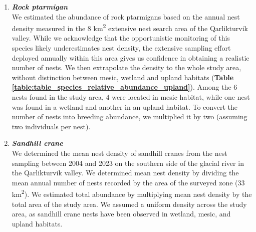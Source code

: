 \documentclass[a4paper,twoside,12pt]{article}
\begin{document}
\begin{enumerate}[label=\alph*.]
                \item[] \textit{\textbf{Rock ptarmigan}}\\
                We estimated the abundance of rock ptarmigans based on the annual nest density measured in the 8 km\textsuperscript{2} extensive nest search area of the Qarlikturvik valley. While we acknowledge that the opportunistic monitoring of this species likely underestimates nest density, the extensive sampling effort deployed annually within this area gives us confidence in obtaining a realistic number of nests. We then extrapolate the density to the whole study area, without distinction between mesic, wetland and upland habitats (\textbf{Table \ref{table:table_species_relative_abundance_upland}}). Among the 6 nests found in the study area, 4 were located in mesic habitat, while one nest was found in a wetland and another in an upland habitat. To convert the number of nests into breeding abundance, we multiplied it by two (assuming two individuals per nest).
                
                \item[] \textit{\textbf{Sandhill crane}}\\
               We determined the mean nest density of sandhill cranes from the nest sampling between 2004 and 2023 on the southern side of the glacial river in the Qarlikturvik valley. We determined mean nest density by dividing the mean annual number of nests recorded by the area of the surveyed zone (33 km\textsuperscript{2}). We estimated total abundance by multiplying mean nest density by the total area of the study area. We assumed a uniform density across the study area, as sandhill crane nests have been observed in wetland, mesic, and upland habitats.
                

\end{enumerate}
\end{document}
